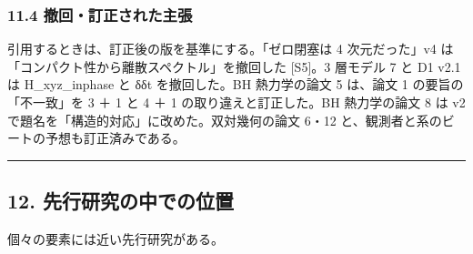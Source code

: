 \documentclass[
  a4paper,
]{ltjsarticle}
\begin{document}
\subsubsection{11.4
撤回・訂正された主張}\label{ux64a4ux56deux8a02ux6b63ux3055ux308cux305fux4e3bux5f35}

引用するときは、訂正後の版を基準にする。「ゼロ閉塞は 4 次元だった」v4
は「コンパクト性から離散スペクトル」を撤回した {[}S5{]}。3 層モデル 7 と
D1 v2.1 は H\_xyz\_inphase と δδt を撤回した。BH 熱力学の論文 5 は、論文
1 の要旨の「不一致」を 3 ＋ 1 と 4 ＋ 1 の取り違えと訂正した。BH
熱力学の論文 8 は v2 で題名を「構造的対応」に改めた。双対幾何の論文
6・12 と、観測者と系のビートの予想も訂正済みである。

\begin{center}\rule{0.5\linewidth}{0.5pt}\end{center}

\subsection{12.
先行研究の中での位置}\label{ux5148ux884cux7814ux7a76ux306eux4e2dux3067ux306eux4f4dux7f6e}

個々の要素には近い先行研究がある。
\end{document}
